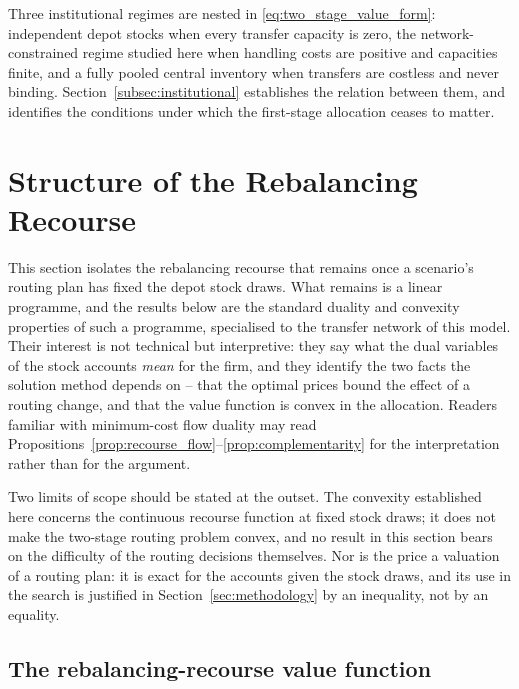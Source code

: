 \documentclass[authoryear,final,3p,times]{elsarticle}
\theoremstyle{definition}
\theoremstyle{plain}
\begin{document}
Three institutional regimes are nested in \eqref{eq:two_stage_value_form}: independent depot stocks when every transfer capacity is zero, the network-constrained regime studied here when handling costs are positive and capacities finite, and a fully pooled central inventory when transfers are costless and never binding. Section~\ref{subsec:institutional} establishes the relation between them, and identifies the conditions under which the first-stage allocation ceases to matter.

\section{Structure of the Rebalancing Recourse}
\label{sec:rebalancing_recourse}
\label{subsec:structural}

This section isolates the rebalancing recourse that remains once a scenario's
routing plan has fixed the depot stock draws. What remains is a linear
programme, and the results below are the standard duality and convexity
properties of such a programme, specialised to the transfer network of this
model. Their interest is not technical but interpretive: they say what the
dual variables of the stock accounts \emph{mean} for the firm, and they
identify the two facts the solution method depends on -- that the optimal
prices bound the effect of a routing change, and that the value function is
convex in the allocation. Readers familiar with minimum-cost flow duality may
read Propositions~\ref{prop:recourse_flow}--\ref{prop:complementarity} for
the interpretation rather than for the argument.

Two limits of scope should be stated at the outset. The convexity established
here concerns the continuous recourse function at fixed stock draws; it
does not make the two-stage routing problem convex, and no result in this
section bears on the difficulty of the routing decisions themselves. Nor is
the price a valuation of a routing plan: it is exact for the accounts given
the stock draws, and its use in the search is justified in
Section~\ref{sec:methodology} by an inequality, not by an equality.

\subsection{The rebalancing-recourse value function}
\label{subsec:recourse_value}
\end{document}

